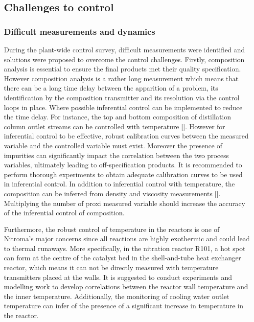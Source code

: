 \subsection{Challenges to control}%

\subsubsection{Difficult measurements and dynamics} %
During the plant-wide control survey, difficult measurements were identified and solutions were proposed to overcome the control challenges. Firstly, composition analysis is essential to ensure the final products met their quality specification. However composition analysis is a rather long measurement which means that there can be a long time delay between the apparition of a problem, its identification by the composition transmitter and its resolution via the control loops in place. Where possible inferential control can be implemented to reduce the time delay. For instance, the top and bottom composition of distillation column outlet streams can be controlled with temperature []. However for inferential control to be effective, robust calibration curves between the measured variable and the controlled variable must exist. Moreover the presence of impurities can significantly impact the correlation between the two process variables, ultimately leading to off-specification products. It is recommended to perform thorough experiments to obtain adequate calibration curves to be used in inferential control. In addition to inferential control with temperature, the composition can be inferred from density and viscosity measurements []. Multiplying the number of proxi measured variable should increase the accuracy of the inferential control of composition.

Furthermore, the robust control of temperature in the reactors is one of Nitroma's major concerns since all reactions are highly exothermic and could lead to thermal runaways. More specifically, in the nitration reactor R101, a hot spot can form at the centre of the catalyst bed in the shell-and-tube heat exchanger reactor, which means it can not be directly measured with temperature transmitters placed at the walls. It is suggested to conduct experiments and modelling work to develop correlations between the reactor wall temperature and the inner temperature. Additionally, the monitoring of cooling water outlet temperature can infer of the presence of a significant increase in temperature in the reactor.


